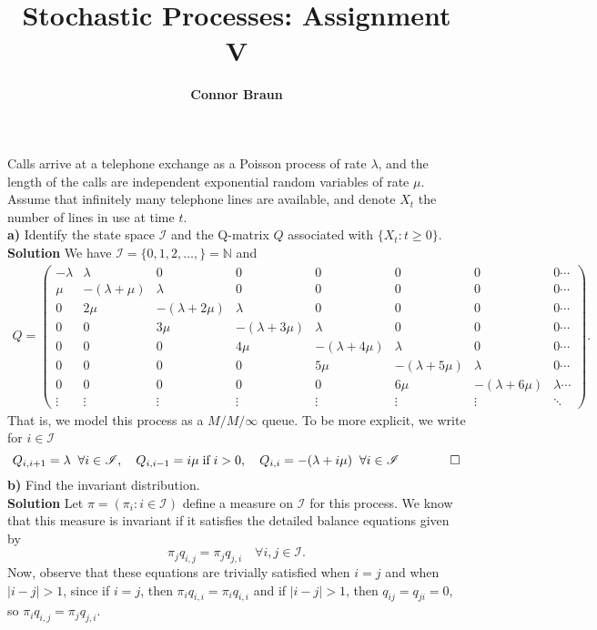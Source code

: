 \documentclass[11pt, letterpaper]{article}
\title{\bf Stochastic Processes: Assignment V}
\author{\bf Connor Braun}
\date{}
\newcommand{\mbb}[1]{\mathbb{#1}}
\newcommand{\mc}[1]{\mathcal{#1}}
\begin{document}
    \maketitle
     Calls arrive at a telephone exchange as a Poisson process of rate $\lambda$, and the length of the calls are independent exponential random variables
    of rate $\mu$. Assume that infinitely many telephone lines are available, and denote $X_t$ the number of lines in use at time $t$.\\[10pt]
    {\bf a)} Identify the state space $\mc{I}$ and the Q-matrix $Q$ associated with $\{X_t:t\geq 0\}$.\\[10pt]
    {\bf Solution} We have $\mc{I}=\{0,1,2,\dots,\}=\mbb{N}$ and
    \begin{align*}
        Q=\begin{pmatrix}
            -\lambda & \lambda & 0 & 0 & 0 & 0 & 0 & 0\cdots\\
            \mu & -(\lambda +\mu) & \lambda & 0 & 0 & 0 & 0 & 0\cdots\\
            0 & 2\mu & -(\lambda+2\mu) & \lambda & 0 & 0 & 0 & 0\cdots\\
            0 & 0 & 3\mu & -(\lambda +3\mu) & \lambda & 0 & 0 & 0\cdots\\
            0 & 0 & 0 & 4\mu & -(\lambda+4\mu) & \lambda & 0 & 0\cdots\\
            0 & 0 & 0 & 0 & 5\mu & -(\lambda+5\mu) & \lambda & 0\cdots\\
            0 & 0 & 0 & 0 & 0 & 6\mu & -(\lambda+6\mu) & \lambda\cdots\\
            \vdots & \vdots & \vdots & \vdots & \vdots & \vdots & \vdots & \ddots
        \end{pmatrix}.
    \end{align*}
    That is, we model this process as a $M/M/\infty$ queue. To be more explicit, we write for $i\in\mc{I}$
    \[Q_{i,i+1}=\lambda\;\;\forall i\in\mc{I},\quad Q_{i,i-1}=i\mu\;\text{if\;}i>0,\quad Q_{i,i}=-(\lambda+i\mu)\;\;\forall i\in\mc{I}\tag*{$\qed$}\]
    {\bf b)} Find the invariant distribution.\\[10pt]
    {\bf Solution} Let $\pi=(\pi_i:i\in\mc{I})$ define a measure on $\mc{I}$ for this process. We know that this measure is invariant if it satisfies the detailed balance equations given by
    \[\pi_jq_{i,j}=\pi_jq_{j,i}\quad\forall i,j\in\mc{I}.\]
    Now, observe that these equations are trivially satisfied when $i=j$ and when $|i-j|>1$, since if $i=j$, then $\pi_iq_{i,i}=\pi_iq_{i,i}$ and if $|i-j|>1$, then $q_{ij}=q_{ji}=0$, so $\pi_iq_{i,j}=\pi_jq_{j,i}$.
\end{document}
